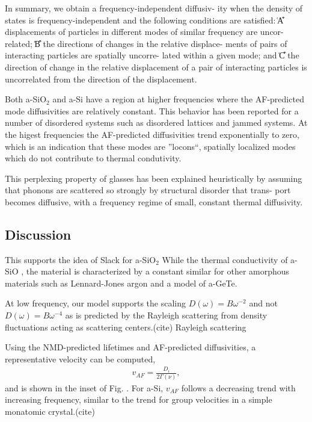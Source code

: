 \documentclass[aps,prb,twocolumn,superscriptaddress,footinbib,amsmath,amssymb,floatfix]{revtex4}
\begin{document}
In summary, we obtain a frequency-independent diffusiv-
ity when the density of states is frequency-independent and
the following conditions are satisfied: ͑A͒ displacements of
particles in different modes of similar frequency are uncor-
related; ͑B͒ the directions of changes in the relative displace-
ments of pairs of interacting particles are spatially uncorre-
lated within a given mode; and ͑C͒ the direction of change in
the relative displacement of a pair of interacting particles is
uncorrelated from the direction of the displacement.

Both a-SiO$_2$ and a-Si have a region at higher frequencies where the 
AF-predicted mode diffusivities are relatively constant. This behavior 
has been reported for a number of disordered systems such as 
disordered lattices
\cite{sheng_heat_1991,beltukov_ioffe-regel_2013,larkin_predicting_2013} 
and jammed systems. At the higest frequencies the AF-predicted 
diffusivities trend exponentially to zero, which is an indication 
that these modes are ''locons``, spatially localized modes which 
do not contribute to thermal condutivity.\cite{allen_diffusons_1999} 

This perplexing property of glasses
has been explained heuristically by assuming that phonons
are scattered so strongly by structural disorder that trans-
port becomes diffusive, with a frequency regime of small,
constant thermal diffusivity.
\cite{kittel_interpretation_1949,sheng_heat_1991,allen_thermal_1993} 

\subsection{\label{S:Diffusivities}Discussion}

This supports the idea of Slack for a-SiO$_2$\cite{slack_thermal_1979}
While the thermal conductivity of a-SiO , the material is characterized by 
a constant similar for other amorphous
materials such as Lennard-Jones argon\cite{larkin_predicting_2013} 
and a model of a-GeTe.\cite{sosso_thermal_2012}

At low frequency, our model supports the scaling 
$D(\omega) = B \omega^{-2}$ and not $D(\omega) = B \omega^{-4}$ as is 
predicted by the Rayleigh scattering from density fluctuations acting 
as scattering centers.(cite) Rayleigh scattering 

Using the NMD-predicted lifetimes and AF-predicted diffusivities, a 
representative velocity can be computed, 
\begin{equation}\label{EQ:vAF}
\begin{split}
v_{AF} = \frac{D_{i}}{2\Gamma(\nu)},
\end{split}
\end{equation}
and is shown in the inset of Fig. . For a-Si, $v_{AF}$ follows a 
decreasing trend with increasing frequency, similar to the trend 
for group velocities in a simple monatomic crystal.(cite) 
\end{document}
